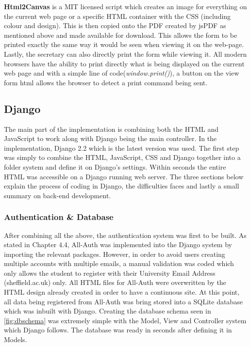 \documentclass[../main.tex]{subfiles}
\begin{document}
\textbf{Html2Canvas}\cite{htmlcanvas} is a MIT licensed script which creates an image for everything on the current web page or a specific HTML container with the CSS (including colour and design). This is then copied onto the PDF created by jsPDF as mentioned above and made available for download. This allows the form to be printed exactly the same way it would be seen when viewing it on the web-page. \\[4mm]

Lastly, the secretary can also directly print the form while viewing it. All modern browsers have the ability to print directly what is being displayed on the current web page and with a simple line of code(\textit{window.print()}), a button on the view form html allows the browser to detect a print command being sent. 



\subsection{Django}
The main part of the implementation is combining both the HTML and JavaScript to work along with Django being the main controller. In the implementation, Django 2.2\cite{djangoLatest} which is the latest version was used. The first step was simply to combine the HTML, JavaScript, CSS and Django together into a folder system and define it on Django's settings. Within seconds the entire HTML was accessible on a Django running web server. The three sections below explain the process of coding in Django, the difficulties faces and lastly a small summary on back-end development. 

\subsubsection{Authentication \& Database}
After combining all the above, the authentication system was first to be built. As stated in Chapter 4.4, All-Auth\cite{allauth} was implemented into the Django system by importing the relevant packages. However, in order to avoid users creating multiple accounts with multiple emails, a manual validation was coded which only allows the student to register with their University Email Address (sheffield.ac.uk) only. All HTML files for All-Auth were overwritten by the HTML design already created in order to have a continuous site. At this point, all data being registered from All-Auth was bring stored into a SQLite database which was inbuilt with Django. Creating the database schema seen in \ref{fig:dbschema} was extremely simple with the Model, View and Controller system which Django follows. The database was ready in seconds after defining it in Models. \\[4mm]
\end{document}
